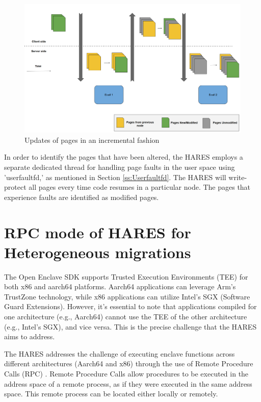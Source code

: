 \documentclass[article, doublespace,nopageskip]{VTthesis} %
\newcommand{\monitor}{HARES }
\begin{document}
    \begin{figure}[htb]
	    \centering
		\includegraphics[scale=0.7]{figures/incremental_pages.png}
		\caption{Updates of pages in an incremental fashion} 
		\label{fig:pages_incremental}
	\end{figure}


    In order to identify the pages that have been altered, the \monitor employs a separate dedicated thread for handling page faults in the user space using 'userfaultfd,' as mentioned in Section \ref{ss:Userfaultfd}. The \monitor will write-protect all pages every time code resumes in a particular node. The pages that experience faults are identified as modified pages.

    \section{RPC mode of \monitor for Heterogeneous migrations} \label{ase: RPC mode}
    The Open Enclave SDK supports Trusted Execution Environments (TEE) for both x86 and aarch64 platforms. Aarch64 applications can leverage Arm's TrustZone technology, while x86 applications can utilize Intel's SGX (Software Guard Extensions). However, it's essential to note that applications compiled for one architecture (e.g., Aarch64) cannot use the TEE of the other architecture (e.g., Intel's SGX), and vice versa. This is the precise challenge that the \monitor aims to address. 

    The \monitor addresses the challenge of executing enclave functions across different architectures (Aarch64 and x86) through the use of Remote Procedure Calls (RPC) \cite{Remote-procedure-call}. Remote Procedure Calls allow procedures to be executed in the address space of a remote process, as if they were executed in the same address space. This remote process can be located either locally or remotely.
\end{document}

